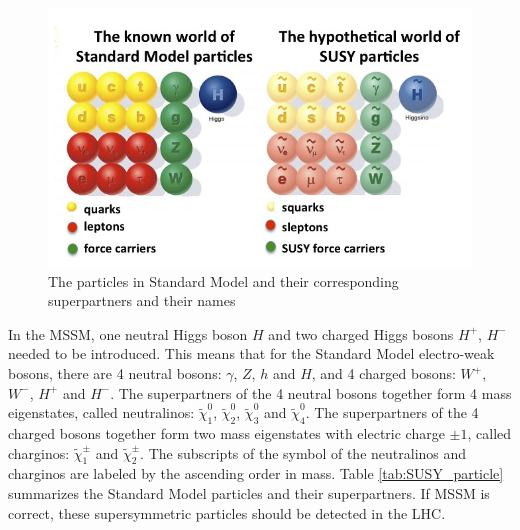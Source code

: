 \begin{figure}
\centering
\includegraphics[width=\textwidth]{data/photo/theory/SM-SUSY-diagram.jpg}
\caption{The particles in Standard Model and their corresponding superpartners and their names}
\label{fig:SUSY_particles}
\end{figure}

In the MSSM, one neutral Higgs boson $H$ and two charged Higgs bosons $H^+$, $H^-$ needed to be introduced.
This means that for the Standard Model electro-weak bosons, there are 4 neutral bosons: $\gamma$, $Z$, $h$ and $H$, and 4 charged bosons: $W^+$, $W^-$, $H^+$ and $H^-$.
The superpartners of the 4 neutral bosons together form 4 mass eigenstates, called neutralinos: $\tilde{\chi}_1^0$, $\tilde{\chi}_2^0$, $\tilde{\chi}_3^0$ and $\tilde{\chi}_4^0$.
The superpartners of the 4 charged bosons together form two mass eigenstates with electric charge $\pm 1$, called charginos: $\tilde{\chi}_1^\pm$ and $\tilde{\chi}_2^\pm$.
The subscripts of the symbol of the neutralinos and charginos are labeled by the ascending order in mass.
Table \ref{tab:SUSY_particle} summarizes the Standard Model particles and their superpartners.
If MSSM is correct, these supersymmetric particles should be detected in the LHC.

